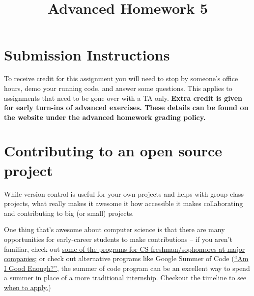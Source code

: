 \documentclass{article}
\begin{document}
\fancyfoot[C]{\color{gray} \thepage~/~\pageref*{LastPage}}
\pagestyle{fancyplain}

\title{\textbf{Advanced Homework 5\\}}
\author{\textbf{\color{red}{Due: Wednesday, October 18th, 11:59PM (Hard Deadline)}}}
\date{}
\maketitle


\section*{Submission Instructions}
To receive credit for this assignment you will need to stop by someone's
office hours, demo your running code, and answer some questions. \textbf{\color{red}{Make sure
to check the office hour schedule as the real due date is at the last office
hours before the date listed above.}} This applies to assignments that need to be gone over with a TA only.
\textbf{Extra credit is given for early turn-ins of advanced exercises. These details can be found on the website under the advanced homework grading policy.}


\section*{Contributing to an open source project}

While version control is useful for your own projects and helps with group
class projects, what really makes it awesome it how accessible it makes
collaborating and contributing to big (or small) projects.

One thing that's awesome about computer science is that there are many
opportunities for early-career students to make contributions -- if you aren't
familiar, check out
\href{https://www.quora.com/What-companies-have-internship-programs-specifically-for-college-freshmen-and-sophomores}{some
  of the programs for CS freshman/sophomores at major companies}; or check out
alternative programs like Google Summer of Code
(\href{http://write.flossmanuals.net/gsocstudentguide/am-i-good-enough/}
{``Am I Good Enough?''}, the summer of code program can be an excellent way to
spend a summer in place of a more traditional internship.
\href{https://developers.google.com/open-source/gsoc/timeline}
  {Checkout the timeline to see when to apply.})
\end{document}
